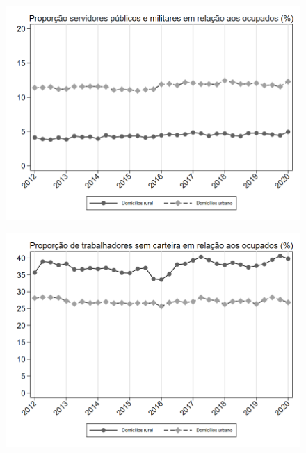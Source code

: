 \begin{frame}[label=_composicao_demografica_rural_urbano_prop_militar]{}
\textit{\hyperlink{_composicao_demografica_rural_urbano}{}}
\begin{figure}
  \centering
  \includegraphics[width=1.0\linewidth]{../../analysis/output/composicao_demografica/area_geografica/_composicao_demografica_rural_urbano_prop_militar.png}
  \caption{}
  \label{fig:_composicao_demografica_rural_urbano_prop_militar}
\end{figure}
\end{frame}


\begin{frame}[label=_composicao_demografica_rural_urbano_prop_empregadoSC]{}
\textit{\hyperlink{_composicao_demografica_rural_urbano}{}}
\begin{figure}
  \centering
  \includegraphics[width=1.0\linewidth]{../../analysis/output/composicao_demografica/area_geografica/_composicao_demografica_rural_urbano_prop_empregadoSC.png}
  \caption{}
  \label{fig:_composicao_demografica_rural_urbano_prop_empregadoSC}
\end{figure}
\end{frame}

